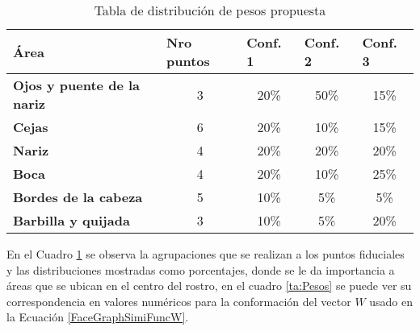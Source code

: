 \begin{table}[h]
\centering
\caption{Tabla de distribución de pesos propuesta}
\label{ta:distPuntos}
\begin{tabular}{|l|c|c|c|c|}
\hline
\textbf{Área}                      & \multicolumn{1}{l|}{\textbf{Nro puntos}} & \multicolumn{1}{l|}{\textbf{Conf. 1}} & \multicolumn{1}{l|}{\textbf{Conf. 2}} & \multicolumn{1}{l|}{\textbf{Conf. 3}} \\ \hline
\textbf{Ojos y puente de la nariz} & 3                                        & 20\%                                  & 50\%                                  & 15\%                                  \\ \hline
\textbf{Cejas}                     & 6                                        & 20\%                                  & 10\%                                  & 15\%                                  \\ \hline
\textbf{Nariz}                     & 4                                        & 20\%                                  & 20\%                                  & 20\%                                  \\ \hline
\textbf{Boca}                      & 4                                        & 20\%                                  & 10\%                                  & 25\%                                  \\ \hline
\textbf{Bordes de la cabeza}       & 5                                        & 10\%                                  & 5\%                                   & 5\%                                   \\ \hline
\textbf{Barbilla y quijada}        & 3                                        & 10\%                                  & 5\%                                   & 20\%                                  \\ \hline
\end{tabular}
\end{table}

En el Cuadro \ref{ta:distPuntos} se observa la agrupaciones que se realizan a los puntos fiduciales y las distribuciones mostradas como porcentajes, donde se le da importancia a áreas que se ubican en el centro del rostro, en el cuadro \ref{ta:Pesos} se puede ver su correspondencia en valores numéricos para la conformación del vector $W$ usado en la Ecuación \ref{FaceGraphSimiFuncW}.

